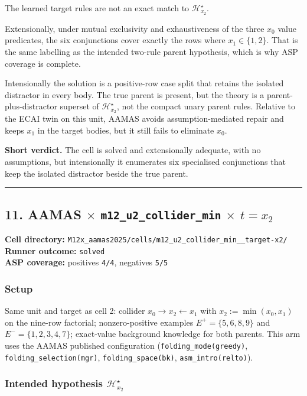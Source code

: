 \documentclass[11pt]{article}
\begin{document}
The learned target rules are not an exact match to \(\mathcal{H}_{x_2}^\star\).

Extensionally, under mutual exclusivity and exhaustiveness of the three \(x_0\) value
predicates, the six conjunctions cover exactly the rows where \(x_1\in\{1,2\}\). That is
the same labelling as the intended two-rule parent hypothesis, which is why ASP coverage
is complete.

Intensionally the solution is a positive-row case split that retains the isolated
distractor in every body. The true parent is present, but the theory is a
parent-plus-distractor superset of \(\mathcal{H}_{x_2}^\star\), not the compact unary
parent rules. Relative to the ECAI twin on this unit, AAMAS avoids assumption-mediated
repair and keeps \(x_1\) in the target bodies, but it still fails to eliminate \(x_0\).

\textbf{Short verdict.} The cell is solved and extensionally adequate, with no assumptions,
but intensionally it enumerates six specialised conjunctions that keep the isolated
distractor beside the true parent.

\medskip\hrule\medskip

\subsection{\texorpdfstring{11. AAMAS \(\times\) \texttt{m12\_u2\_collider\_min} \(\times\) \(t=x_2\)}{11. AAMAS - m12-u2-collider-min - target x2}}

\textbf{Cell directory:} \texttt{M12x\_aamas2025/cells/m12\_u2\_collider\_min\_\_target-x2/}\\
\textbf{Runner outcome:} \texttt{solved}\\
\textbf{ASP coverage:} positives \texttt{4/4}, negatives \texttt{5/5}

\subsubsection{Setup}

Same unit and target as cell 2: collider \(x_0\to x_2\leftarrow x_1\) with \(x_2:=\min(x_0,x_1)\) on the nine-row factorial; nonzero-positive examples \(E^+=\{5,6,8,9\}\) and \(E^-=\{1,2,3,4,7\}\); exact-value background knowledge for both parents. This arm uses the AAMAS published configuration (\texttt{folding\_mode(greedy)}, \texttt{folding\_selection(mgr)}, \texttt{folding\_space(bk)}, \texttt{asm\_intro(relto)}).

\subsubsection{\texorpdfstring{Intended hypothesis \(\mathcal{H}_{x_2}^\star\)}{Intended hypothesis H-star(x2)}}
\end{document}
